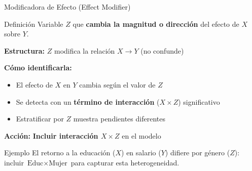 \documentclass[aspectratio=169,11pt]{beamer}
\newcommand{\highlight}[1]{\textcolor{uddlight}{\bfseries #1}}
\begin{document}
\begin{frame}{Modificadora de Efecto (Effect Modifier)}
\small
\begin{block}{Definici\'on}
    Variable $Z$ que \textbf{cambia la magnitud o direcci\'on} del efecto de $X$ sobre $Y$.
\end{block}

\vspace{0.1cm}
\textbf{Estructura:} $Z$ modifica la relaci\'on $X \rightarrow Y$ (no confunde)

\vspace{0.1cm}
\textbf{C\'omo identificarla:}
\begin{itemize}
    \setlength{\itemsep}{1pt}
    \item El efecto de $X$ en $Y$ cambia seg\'un el valor de $Z$
    \item Se detecta con un \textbf{t\'ermino de interacci\'on} ($X \times Z$) significativo
    \item Estratificar por $Z$ muestra pendientes diferentes
\end{itemize}

\vspace{0.1cm}
\textbf{Acci\'on:} \highlight{Incluir interacci\'on $X \times Z$} en el modelo

\vspace{0.1cm}
\begin{exampleblock}{Ejemplo}
    \scriptsize
    El retorno a la educaci\'on ($X$) en salario ($Y$) difiere por g\'enero ($Z$): incluir $\text{Educ} \times \text{Mujer}$ para capturar esta heterogeneidad.
\end{exampleblock}
\end{frame}
\end{document}

